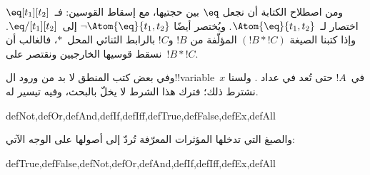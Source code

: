 \documentclass[../../../include/open-logic-section]{subfiles}
\begin{document}
ومن اصطلاح الكتابة أن نجعل $\eq$ بين حجتيها، مع إسقاط القوسين:
فـ~$\eq[t_1][t_2]$ اختصار لـ~$\Atom{\eq}{t_1,t_2}$. ويُختصر أيضًا
$\lnot \Atom{\eq}{t_1,t_2}$ إلى~$\eq/[t_1][t_2]$. وإذا كتبنا الصيغة
$(!B \ast !C)$ المؤلّفة من $!B$ و$!C$ بالرابط الثنائي
المحل~$\ast$، فالغالب أن نسقط قوسيها الخارجيين ونقتصر
على~$!B \ast !C$.

\begin{intro}
وفي بعض كتب المنطق لا بد من ورود ال!!{variable}~$x$ في~$!A$ حتى تُعد
%
%
%
في عداد
.
ولسنا نشترط ذلك؛ فترك هذا الشرط لا يخلّ بالبحث، وفيه تيسير له.
\end{intro}

\begin{tagblock}{defNot,defOr,defAnd,defIf,defIff,defTrue,defFalse,defEx,defAll}
\begin{defn}
والصيغ التي تدخلها المؤثرات المعرّفة تُردّ إلى أصولها على الوجه الآتي:

\begin{tagenumerate}{defTrue,defFalse,defNot,defOr,defAnd,defIf,defIff,defEx,defAll}









\end{tagenumerate}
\end{defn}
\end{tagblock}
\end{document}
